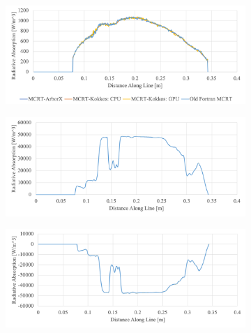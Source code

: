 \begin{figure}
  \begin{subfigure}{1\textwidth}
  \includegraphics[width=\linewidth]{figures/ch4/LineComparison_RadAbs.png}
  \caption{}
  \label{fig:BFS_RadAbs}
  \end{subfigure}
  \begin{subfigure}{1\textwidth}
  \includegraphics[width=\linewidth]{figures/ch4/LineComparison_RadEmi.png}
  \caption{}
  \label{fig:BFS_RadEmi}
  \end{subfigure}
  \begin{subfigure}{1\textwidth}
  \includegraphics[width=\linewidth]{figures/ch4/LineComparison_RadSrc.png}
  \caption{}
  \label{fig:BFS_RadSrc}
  \end{subfigure}
  \label{fig:PPcomp}
\end{figure}


